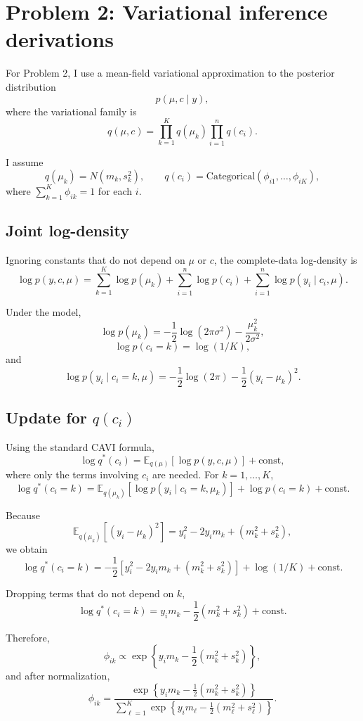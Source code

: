 \documentclass[
]{article}
\begin{document}
\section{Problem 2: Variational inference
derivations}\label{problem-2-variational-inference-derivations}

For Problem 2, I use a mean-field variational approximation to the
posterior distribution \[
p(\mu, c \mid y),
\] where the variational family is \[
q(\mu, c)
=
\prod_{k=1}^K q(\mu_k)\prod_{i=1}^n q(c_i).
\]

I assume \[
q(\mu_k) = N(m_k, s_k^2),
\qquad
q(c_i) = \text{Categorical}(\phi_{i1}, \dots, \phi_{iK}),
\] where \(\sum_{k=1}^K \phi_{ik} = 1\) for each \(i\).

\subsection{Joint log-density}\label{joint-log-density}

Ignoring constants that do not depend on \(\mu\) or \(c\), the
complete-data log-density is \[
\log p(y, c, \mu)
=
\sum_{k=1}^K \log p(\mu_k)
+
\sum_{i=1}^n \log p(c_i)
+
\sum_{i=1}^n \log p(y_i \mid c_i, \mu).
\]

Under the model, \[
\log p(\mu_k)
=
-\frac12 \log(2\pi \sigma^2) - \frac{\mu_k^2}{2\sigma^2},
\] \[
\log p(c_i = k) = \log(1/K),
\] and \[
\log p(y_i \mid c_i = k, \mu)
=
-\frac12 \log(2\pi) - \frac12 (y_i - \mu_k)^2.
\]

\subsection{\texorpdfstring{Update for
\(q(c_i)\)}{Update for q(c\_i)}}\label{update-for-qc_i}

Using the standard CAVI formula, \[
\log q^*(c_i)
=
\mathbb{E}_{q(\mu)}[\log p(y, c, \mu)] + \text{const},
\] where only the terms involving \(c_i\) are needed. For
\(k = 1,\dots,K\), \[
\log q^*(c_i = k)
=
\mathbb{E}_{q(\mu_k)}[\log p(y_i \mid c_i = k, \mu_k)]
+ \log p(c_i = k)
+ \text{const}.
\]

Because \[
\mathbb{E}_{q(\mu_k)}[(y_i - \mu_k)^2]
=
y_i^2 - 2 y_i m_k + (m_k^2 + s_k^2),
\] we obtain \[
\log q^*(c_i = k)
=
-\frac12\left[y_i^2 - 2y_i m_k + (m_k^2 + s_k^2)\right]
+ \log(1/K)
+ \text{const}.
\]

Dropping terms that do not depend on \(k\), \[
\log q^*(c_i = k)
=
y_i m_k - \frac12(m_k^2 + s_k^2) + \text{const}.
\]

Therefore, \[
\phi_{ik}
\propto
\exp\left\{
y_i m_k - \frac12(m_k^2 + s_k^2)
\right\},
\] and after normalization, \[
\phi_{ik}
=
\frac{
\exp\left\{
y_i m_k - \frac12(m_k^2 + s_k^2)
\right\}
}{
\sum_{\ell=1}^K
\exp\left\{
y_i m_\ell - \frac12(m_\ell^2 + s_\ell^2)
\right\}
}.
\]
\end{document}
